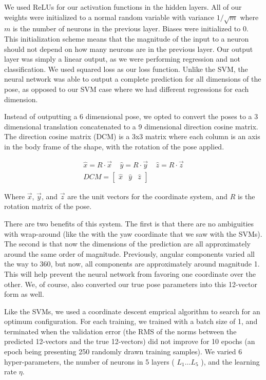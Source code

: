 \documentclass[journal]{IEEEtran}
\begin{document}
We used ReLUs for our activation functions in the hidden layers. All of our weights were initialized to a normal random variable with variance $1/\sqrt{m}$ where $m$ is the number of neurons in the previous layer. Biases were initialized to 0. This initialization scheme means that the magnitude of the input to a neuron should not depend on how many neurons are in the previous layer. Our output layer was simply a linear output, as we were performing regression and not classification. We used squared loss as our loss function. Unlike the SVM, the neural network was able to output a complete prediction for all dimensions of the pose, as opposed to our SVM case where we had different regressions for each dimension.

Instead of outputting a 6 dimensional pose, we opted to convert the poses to a 3 dimensional translation concatenated to a 9 dimensional direction cosine matrix. The direction cosine matrix (DCM) is a 3x3 matrix where each column is an axis in the body frame of the shape, with the rotation of the pose applied.

\begin{gather}
\nonumber \hat x = R \cdot \vec x \; \; \; \; \hat y = R \cdot \vec y \; \; \; \; \hat z = R \cdot \vec z\\
DCM =
\begin{bmatrix}
\hat x & \hat y & \hat z
\end{bmatrix}
\end{gather} 

\noindent Where $\vec x$, $\vec y$, and $\vec z$ are the unit vectors for the coordinate system, and $R$ is the rotation matrix of the pose.

There are two benefits of this system. The first is that there are no ambiguities with wrap-around (like the with the yaw coordinate that we saw with the SVMs). The second is that now the dimensions of the prediction are all approximately around the same order of magnitude. Previously, angular components varied all the way to 360, but now, all components are approximately around magnitude 1. This will help prevent the neural network from favoring one coordinate over the other. We, of course, also converted our true pose parameters into this 12-vector form as well.

Like the SVMs, we used a coordinate descent emprical algorithm to search for an optimum configuration. For each training, we trained with a batch size of 1, and terminated when the validation error (the RMS of the norms between the predicted 12-vectors and the true 12-vectors) did not improve for 10 epochs (an epoch being presenting 250 randomly drawn training samples). We varied 6 hyper-parameters, the number of neurons in 5 layers ( $L_1 \dots L_5$ ), and the learning rate $\eta$.
\end{document}
